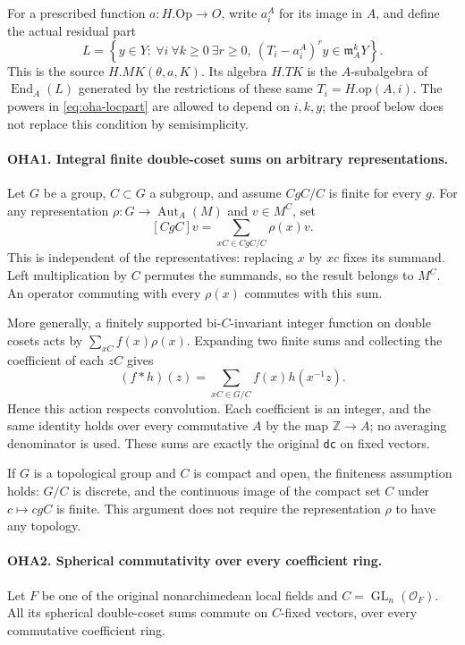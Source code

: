 \documentclass[11pt,a4paper]{article}
\numberwithin{equation}{section}
\theoremstyle{remark}\newtheorem{remark}[theorem]{Remark}
\begin{document}
For a prescribed function \(a:H.\mathrm{Op}\to O\), write
\(a_i^A\) for its image in \(A\), and define the actual residual
part
\begin{equation}\label{eq:oha-locpart}
 L=\left\{y\in Y:
   \ \forall i\ \forall k\ge0\ \exists r\ge0,\
               (T_i-a_i^A)^r y\in\mathfrak m_A^kY\right\}.
\end{equation}
This is the source \(H.MK(\theta,\allowbreak{} a,\allowbreak{} K)\). Its algebra \(H.TK\)
is the \(A\)-subalgebra of \(\operatorname{End}_A(L)\) generated
by the restrictions of these same \(T_i=H.\mathrm{op}(A,\allowbreak{} i)\).
The powers in \eqref{eq:oha-locpart} are allowed to depend on
\(i,\allowbreak{} k,\allowbreak{} y\); the proof below does not replace this condition by
semisimplicity.

\paragraph{OHA1. Integral finite double-coset sums on arbitrary representations.}
\label{claim:OHA1}
Let \(G\) be a group, \(C\subset G\) a subgroup, and assume
\(CgC/C\) is finite for every \(g\). For any representation
\(\rho:G\to\operatorname{Aut}_A(M)\) and \(v\in M^C\), set
\[
                 [CgC]v=\sum_{xC\in CgC/C}\rho(x)v .
\]
This is independent of the representatives: replacing \(x\)
by \(xc\) fixes its summand. Left multiplication by \(C\)
permutes the summands, so the result belongs to \(M^C\).
An operator commuting with every \(\rho(x)\) commutes with
this sum.

More generally, a finitely supported bi-\(C\)-invariant integer
function on double cosets acts by
\(\sum_{xC}f(x)\rho(x)\). Expanding two finite sums and collecting
the coefficient of each \(zC\) gives
\[
 (f*h)(z)=\sum_{xC\in G/C}f(x)h(x^{-1}z).
\]
Hence this action respects convolution. Each coefficient is an
integer, and the same identity holds over every commutative \(A\)
by the map \(\mathbb Z\to A\); no averaging denominator is used.
These sums are exactly the original \texttt{dc} on fixed vectors.

If \(G\) is a topological group and \(C\) is compact and open,
the finiteness assumption holds: \(G/C\) is discrete, and the
continuous image of the compact set \(C\) under \(c\mapsto cgC\)
is finite. This argument does not require the representation
\(\rho\) to have any topology.

\paragraph{OHA2. Spherical commutativity over every coefficient ring.}
\label{claim:OHA2}
Let \(F\) be one of the original nonarchimedean local fields and
\(C=\operatorname{GL}_n(\mathcal O_F)\). All its spherical
double-coset sums commute on \(C\)-fixed vectors, over every
commutative coefficient ring.
\end{document}
